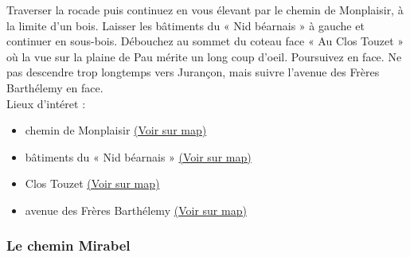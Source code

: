 \documentclass[titlepage]{article}
\begin{document}
                        Traverser la rocade puis continuez en vous élevant par le chemin de Monplaisir, à la limite d'un bois. Laisser les bâtiments du « Nid béarnais » à gauche et continuer en sous-bois. Débouchez au sommet du coteau face « Au Clos Touzet » où la vue sur la plaine de Pau mérite un long coup d'oeil. Poursuivez en face. Ne pas descendre trop longtemps vers Jurançon, mais suivre l'avenue des Frères Barthélemy en face.
                    \\
        Lieux d'intéret : 
        \begin{itemize}
        
        \item {
        chemin de
                            Monplaisir 
        \href{https://www.google.com/maps/?q=43.287530, -0.391115}{(Voir sur map)}
        }
    
        \item {
        bâtiments du « Nid
                            béarnais » 
        \href{https://www.google.com/maps/?q=43.287530, -0.391115}{(Voir sur map)}
        }
    
        \item {
        Clos Touzet 
        \href{https://www.google.com/maps/?q=43.287530, -0.391115}{(Voir sur map)}
        }
    
        \item {
        avenue des Frères
                            Barthélemy 
        \href{https://www.google.com/maps/?q=43.287530, -0.391115}{(Voir sur map)}
        }
    
        \end{itemize}
    
        
        \subsubsection{Le chemin Mirabel}
        \paragraph{}
        
\end{document}
